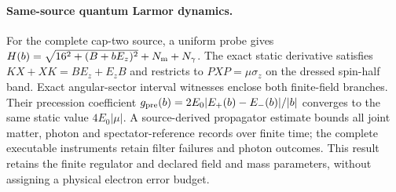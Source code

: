 \paragraph{Same-source quantum Larmor dynamics.}
For the complete cap-two source, a uniform probe gives
$H(b)=\sqrt{16^2+(B+bE_z)^2}+N_{\rm m}+N_\gamma$.
The exact static derivative satisfies $KX+XK=BE_z+E_zB$ and restricts to
$PXP=\mu\sigma_z$ on the dressed spin-half band. Exact angular-sector
interval witnesses enclose both finite-field branches. Their precession
coefficient $g_{\rm pre}(b)=2E_0|E_+(b)-E_-(b)|/|b|$ converges to the
same static value $4E_0|\mu|$. A source-derived propagator estimate bounds
all joint matter, photon and spectator-reference records over finite time;
the complete executable instruments retain filter failures and photon
outcomes. This result retains the finite regulator and declared field and
mass parameters, without assigning a physical electron error budget.

